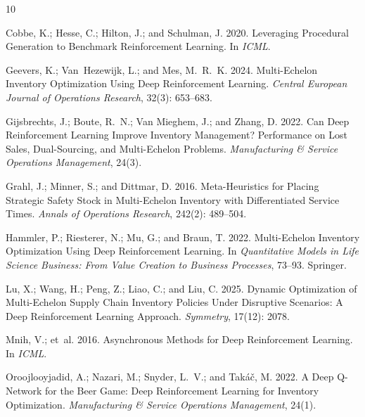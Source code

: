 \documentclass[letterpaper]{article} %
\begin{document}
\begin{thebibliography}{10}
\providecommand{\natexlab}[1]{#1}

Cobbe, K.; Hesse, C.; Hilton, J.; and Schulman, J. 2020.
\newblock Leveraging Procedural Generation to Benchmark
Reinforcement Learning.
\newblock In \emph{ICML}.

Geevers, K.; Van~Hezewijk, L.; and Mes, M.~R.~K. 2024.
\newblock Multi-Echelon Inventory Optimization Using Deep
Reinforcement Learning.
\newblock \emph{Central European Journal of Operations Research},
32(3): 653--683.

Gijsbrechts, J.; Boute, R.~N.; Van Mieghem, J.; and Zhang, D. 2022.
\newblock Can Deep Reinforcement Learning Improve Inventory
Management?  Performance on Lost Sales, Dual-Sourcing, and
Multi-Echelon Problems.
\newblock \emph{Manufacturing \& Service Operations Management},
24(3).

Grahl, J.; Minner, S.; and Dittmar, D. 2016.
\newblock Meta-Heuristics for Placing Strategic Safety Stock in
Multi-Echelon Inventory with Differentiated Service Times.
\newblock \emph{Annals of Operations Research}, 242(2): 489--504.

Hammler, P.; Riesterer, N.; Mu, G.; and Braun, T. 2022.
\newblock Multi-Echelon Inventory Optimization Using Deep
Reinforcement Learning.
\newblock In \emph{Quantitative Models in Life Science Business:
From Value Creation to Business Processes}, 73--93. Springer.

Lu, X.; Wang, H.; Peng, Z.; Liao, C.; and Liu, C. 2025.
\newblock Dynamic Optimization of Multi-Echelon Supply Chain
Inventory Policies Under Disruptive Scenarios: A Deep
Reinforcement Learning Approach.
\newblock \emph{Symmetry}, 17(12): 2078.

Mnih, V.; et~al. 2016.
\newblock Asynchronous Methods for Deep Reinforcement Learning.
\newblock In \emph{ICML}.

Oroojlooyjadid, A.; Nazari, M.; Snyder, L.~V.; and Tak\'a\v{c}, M.
2022.
\newblock A Deep Q-Network for the Beer Game: Deep Reinforcement
Learning for Inventory Optimization.
\newblock \emph{Manufacturing \& Service Operations Management},
24(1).


\end{thebibliography}
\end{document}
